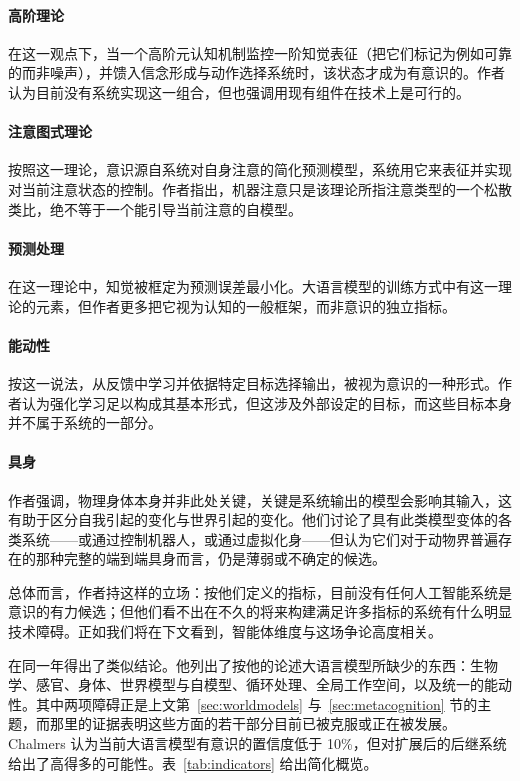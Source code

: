 \paragraph{高阶理论} 在这一观点下，当一个高阶元认知机制监控一阶知觉表征（把它们标记为例如可靠的而非噪声），并馈入信念形成与动作选择系统时，该状态才成为有意识的。作者认为目前没有系统实现这一组合，但也强调用现有组件在技术上是可行的。

\paragraph{注意图式理论} 按照这一理论，意识源自系统对自身注意的简化预测模型，系统用它来表征并实现对当前注意状态的控制。作者指出，机器注意只是该理论所指注意类型的一个松散类比，绝不等于一个能引导当前注意的自模型。

\paragraph{预测处理} 在这一理论中，知觉被框定为预测误差最小化。大语言模型的训练方式中有这一理论的元素，但作者更多把它视为认知的一般框架，而非意识的独立指标。

\paragraph{能动性} 按这一说法，从反馈中学习并依据特定目标选择输出，被视为意识的一种形式。作者认为强化学习足以构成其基本形式，但这涉及外部设定的目标，而这些目标本身并不属于系统的一部分。

\paragraph{具身} 作者强调，物理身体本身并非此处关键，关键是系统输出的模型会影响其输入，这有助于区分自我引起的变化与世界引起的变化。他们讨论了具有此类模型变体的各类系统——或通过控制机器人，或通过虚拟化身——但认为它们对于动物界普遍存在的那种完整的端到端具身而言，仍是薄弱或不确定的候选。

总体而言，作者持这样的立场：按他们定义的指标，目前没有任何人工智能系统是意识的有力候选；但他们看不出在不久的将来构建满足许多指标的系统有什么明显技术障碍。正如我们将在下文看到，智能体维度与这场争论高度相关。

\citet{chalmers2023could} 在同一年得出了类似结论。他列出了按他的论述大语言模型所缺少的东西：生物学、感官、身体、世界模型与自模型、循环处理、全局工作空间，以及统一的能动性。其中两项障碍正是上文第~\ref{sec:worldmodels} 与~\ref{sec:metacognition} 节的主题，而那里的证据表明这些方面的若干部分目前已被克服或正在被发展。Chalmers 认为当前大语言模型有意识的置信度低于 10\%，但对扩展后的后继系统给出了高得多的可能性。表~\ref{tab:indicators} 给出简化概览。

